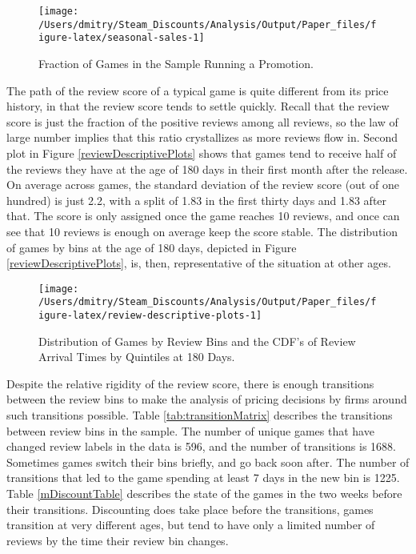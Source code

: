 \documentclass[
  12pt,
  pagebackref]{article}
\begin{document}
\begin{figure}[h]

{\centering \texttt{[image: /Users/dmitry/Steam\_Discounts/Analysis/Output/Paper\_files/figure-latex/seasonal-sales-1]} 

}

\caption{\label{seasonalSales} Fraction of Games in the Sample Running a Promotion.}\label{fig:seasonal-sales}
\end{figure}

The path of the review score of a typical game is quite different from
its price history, in that the review score tends to settle quickly.
Recall that the review score is just the fraction of the positive
reviews among all reviews, so the law of large number implies that this
ratio crystallizes as more reviews flow in. Second plot in Figure
\ref{reviewDescriptivePlots} shows that games tend to receive half of
the reviews they have at the age of 180 days in their first month after
the release. On average across games, the standard deviation of the
review score (out of one hundred) is just 2.2, with a split of 1.83 in
the first thirty days and 1.83 after that. The score is only assigned
once the game reaches 10 reviews, and once can see that 10 reviews is
enough on average keep the score stable. The distribution of games by
bins at the age of 180 days, depicted in Figure
\ref{reviewDescriptivePlots}, is, then, representative of the situation
at other ages.

\begin{figure}[h]

{\centering \texttt{[image: /Users/dmitry/Steam\_Discounts/Analysis/Output/Paper\_files/figure-latex/review-descriptive-plots-1]} 

}

\caption{\label{reviewDescriptivePlots} Distribution of Games by Review Bins and the CDF's of Review Arrival Times by Quintiles at 180 Days.}\label{fig:review-descriptive-plots}
\end{figure}

Despite the relative rigidity of the review score, there is enough
transitions between the review bins to make the analysis of pricing
decisions by firms around such transitions possible. Table
\ref{tab:transitionMatrix} describes the transitions between review bins
in the sample. The number of unique games that have changed review
labels in the data is 596, and the number of transitions is 1688.
Sometimes games switch their bins briefly, and go back soon after. The
number of transitions that led to the game spending at least 7 days in
the new bin is 1225. Table \ref{mDiscountTable} describes the state of
the games in the two weeks before their transitions. Discounting does
take place before the transitions, games transition at very different
ages, but tend to have only a limited number of reviews by the time
their review bin changes.
\end{document}
